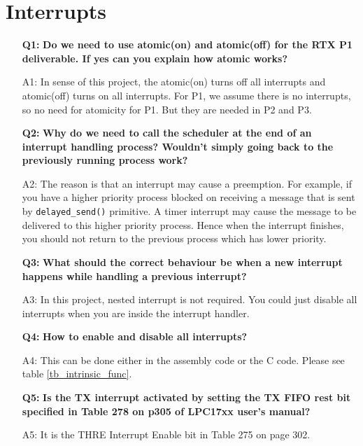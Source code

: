 \section{Interrupts}
\begin{itemize}
\item[{\bf Q1:}] {\bf Do we need to use atomic(on) and atomic(off) for the RTX P1 deliverable. If yes can you explain how atomic works?}
\item[A1:]
In sense of this project, the atomic(on) turns off all interrupts and atomic(off) turns on all interrupts. For P1, we assume there is no interrupts, so no need for atomicity for P1. But they are needed in P2 and P3.

\item[{\bf Q2:}] {\bf Why do we need to call the scheduler at the end of an interrupt handling process? Wouldn't simply going back to the previously running process work?}
\item[A2:] The reason is that an interrupt may cause a preemption. For example, if you have a higher priority process blocked on receiving a message that is sent by \verb+delayed_send()+ primitive. A timer interrupt may cause the message to be delivered to this higher priority process. Hence when the interrupt finishes, you should not return to the previous process which has lower priority.

\item[{\bf Q3:}] {\bf What should the correct behaviour be when a new interrupt happens while handling a previous interrupt?}
\item[A3:] 
In this project, nested interrupt is not required. You could just disable all interrupts when you are inside the interrupt handler.

\item[{\bf Q4:}] {\bf How to enable and disable all interrupts?}
\item[A4:] This can be done either in the assembly code or the C code. Please see table \ref{tb_intrinsic_func}.

\item[{\bf Q5:}] {\bf Is the TX interrupt activated by setting the TX FIFO rest bit specified in Table 278 on p305 of LPC17xx user's manual\cite{nxp.lpc17xx.manual}?}
\item[A5:]  It is the THRE Interrupt Enable bit in Table 275 on page 302.

\end{itemize}


